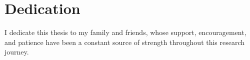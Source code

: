 \section*{Dedication}


I dedicate this thesis to my family and friends, whose support, encouragement, and patience have been a constant source of strength throughout this research journey.
